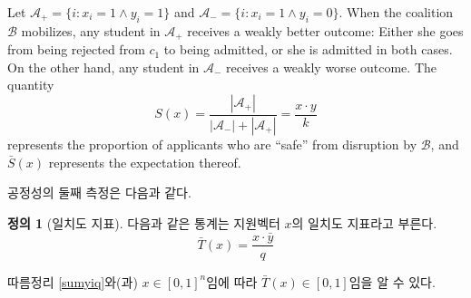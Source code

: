 \documentclass[12pt]{article} %
\newif\ifEN
\theoremstyle{definition}
\newtheorem{definition}{Definition}
\theoremstyle{definition}
\newtheorem{definition}{정의}
\begin{document}
{Let $\mathcal{A}_+ = \{i: x_i = 1 \wedge y_i=1\}$ and $\mathcal{A}_- =  \{i: x_i = 1 \wedge y_i=0\}$. When the coalition $\mathcal{B}$ mobilizes, any student in $\mathcal{A}_+$ receives a weakly better outcome: Either she goes from being rejected from $c_1$ to being admitted, or she is admitted in both cases. On the other hand, any student in $\mathcal{A}_-$ receives a weakly worse outcome. The quantity 
\begin{equation}
S(x) = \frac{|\mathcal{A}_+|}{|\mathcal{A}_-| + |\mathcal{A}_+|} =\frac{x \cdot y}{k}
\end{equation}
represents the proportion of applicants who are ``safe'' from disruption by $\mathcal{B}$, and $\bar S(x)$ represents the expectation thereof. 
}  \fi

\ifEN{
The second measure of fairness is as follows. 
\begin{definition}[Alignment index]
The statistic \begin{equation} \bar T(x) = \frac{x \cdot \bar y}{q}\end{equation} is called the \emph{alignment index} of the application vector $x$.
\end{definition}
By Corollary \ref{sumyiq} and the fact that $x \in [0, 1]^n$, we have $\bar T(x) \in [0, 1]$. 
} \else {
공정성의 둘째 측정은 다음과 같다.
\begin{definition}[일치도 지표]
다음과 같은 통계는 지원벡터 $x$의 일치도 지표라고 부른다. \begin{equation} \bar T(x) = \frac{x \cdot \bar y}{q}\end{equation}\end{definition}
따름정리 \ref{sumyiq}와(과) $x \in [0, 1]^n$임에 따라 $\bar T(x) \in [0, 1]$임을 알 수 있다.
} \fi
\end{document}
